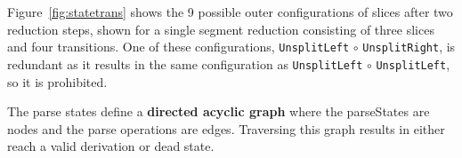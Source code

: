 \documentclass[12pt,a4paper,twoside,openany]{report} \usepackage[pdfborder={0 0 0}]{hyperref}    %
\theoremstyle{definition} \newtheorem{definition}{Definition}[section]
\begin{document}



    Figure~\ref{fig:statetrans} shows the 9 possible outer configurations of slices after two reduction steps, shown for
    a single segment reduction consisting of three slices and four transitions. One of these configurations,
    \texttt{UnsplitLeft} $\circ$ \texttt{UnsplitRight}, is redundant as it results in the same configuration as
    \texttt{UnsplitLeft} $\circ$ \texttt{UnsplitLeft}, so it is prohibited.


    The parse states define a \textbf{directed acyclic graph} where the parseStates are nodes and the parse operations
    are edges. Traversing this graph results in either reach a valid derivation or dead state. 
\end{document}
